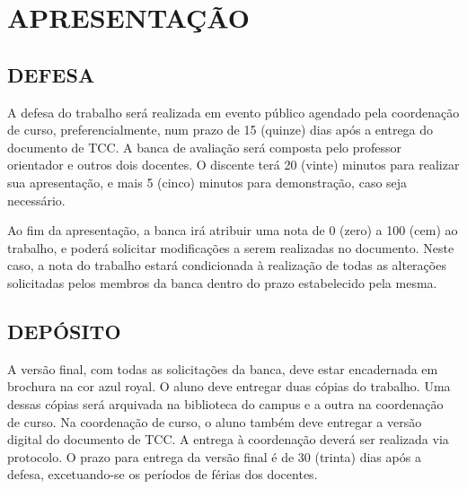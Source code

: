 \chapter{APRESENTAÇÃO}\label{chap:apresentacao}

\section{DEFESA}

A defesa do trabalho será realizada em evento público agendado pela coordenação de curso, preferencialmente, num prazo de 15 (quinze) dias após a entrega do documento de TCC. A banca de avaliação será composta pelo professor orientador e outros dois docentes. O discente terá 20 (vinte) minutos para realizar sua apresentação, e mais 5 (cinco) minutos para demonstração, caso seja necessário.
	
Ao fim da apresentação, a banca irá atribuir uma nota de 0 (zero) a 100 (cem) ao trabalho, e poderá solicitar modificações a serem realizadas no documento. Neste caso, a nota do trabalho estará condicionada à realização de todas as alterações solicitadas pelos membros da banca dentro do prazo estabelecido pela mesma.

\section{DEPÓSITO}

A versão final, com todas as solicitações da banca, deve estar encadernada em brochura na cor azul royal. O aluno deve entregar duas cópias do trabalho. Uma dessas cópias será arquivada na biblioteca do campus e a outra na coordenação de curso. Na coordenação de curso, o aluno também deve entregar a versão digital do documento de TCC. A entrega à coordenação deverá ser realizada via protocolo. O prazo para entrega da versão final é de 30 (trinta) dias após a defesa, excetuando-se os períodos de férias dos docentes.